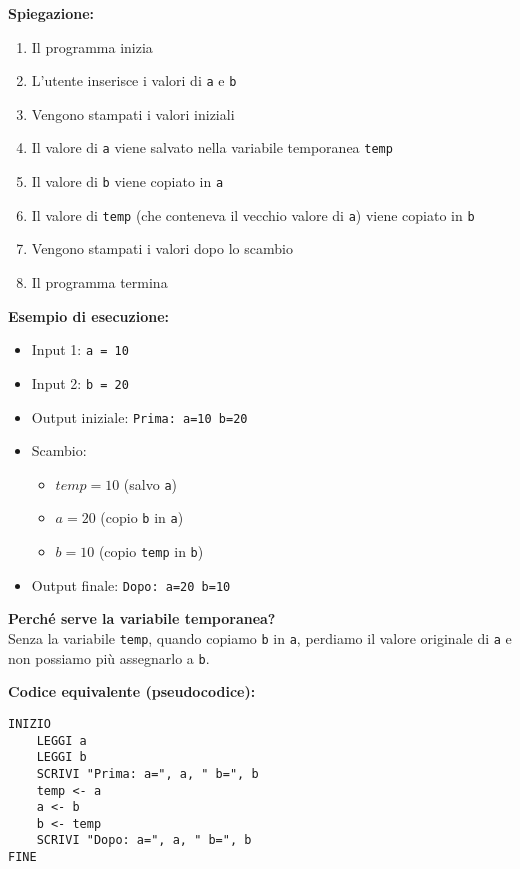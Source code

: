 \documentclass[a4paper,16pt]{article}
\begin{document}
\textbf{Spiegazione:}
\begin{enumerate}
    \item Il programma inizia
    \item L'utente inserisce i valori di \texttt{a} e \texttt{b}
    \item Vengono stampati i valori iniziali
    \item Il valore di \texttt{a} viene salvato nella variabile temporanea \texttt{temp}
    \item Il valore di \texttt{b} viene copiato in \texttt{a}
    \item Il valore di \texttt{temp} (che conteneva il vecchio valore di \texttt{a}) viene copiato in \texttt{b}
    \item Vengono stampati i valori dopo lo scambio
    \item Il programma termina
\end{enumerate}

\textbf{Esempio di esecuzione:}
\begin{itemize}
    \item Input 1: \texttt{a = 10}
    \item Input 2: \texttt{b = 20}
    \item Output iniziale: \texttt{Prima: a=10 b=20}
    \item Scambio:
    \begin{itemize}
        \item $temp = 10$ (salvo \texttt{a})
        \item $a = 20$ (copio \texttt{b} in \texttt{a})
        \item $b = 10$ (copio \texttt{temp} in \texttt{b})
    \end{itemize}
    \item Output finale: \texttt{Dopo: a=20 b=10}
\end{itemize}

\textbf{Perché serve la variabile temporanea?}\\
Senza la variabile \texttt{temp}, quando copiamo \texttt{b} in \texttt{a}, perdiamo il valore originale di \texttt{a} e non possiamo più assegnarlo a \texttt{b}.

\textbf{Codice equivalente (pseudocodice):}
\begin{lstlisting}
INIZIO
    LEGGI a
    LEGGI b
    SCRIVI "Prima: a=", a, " b=", b
    temp <- a
    a <- b
    b <- temp
    SCRIVI "Dopo: a=", a, " b=", b
FINE
\end{lstlisting}

\newpage
\end{document}

